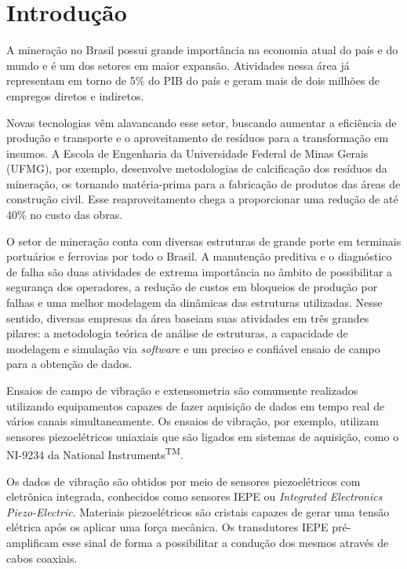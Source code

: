 \documentclass[11pt]{abntex2}
\begin{document}
\makeatletter
	\imprimircapa
	\imprimirfolhaderosto

	\begin{resumo}
		
	\end{resumo}

	\tableofcontents
	\newpage
	\listoffigures
	\newpage
	
	\chapter{Introdução}
		A mineração no Brasil possui grande importância na economia atual do país e
		do mundo e é um dos setores em maior expansão. Atividades nessa área já
		representam em torno de 5\% do PIB do país e geram mais de dois milhões de
		empregos diretos e indiretos.\cite{pib}

		Novas tecnologias vêm alavancando esse setor, buscando aumentar a eficiência
		de produção e transporte e o aproveitamento de resíduos para a
		transformação em insumos. A Escola de Engenharia da Universidade Federal de
		Minas Gerais (UFMG), por exemplo, desenvolve metodologias de calcificação
		dos resíduos da mineração, os tornando matéria-prima para a fabricação de
		produtos das áreas de construção civil. Esse reaproveitamento chega a
		proporcionar uma redução de até 40\% no custo das obras.\cite{mineracaoUFMG}
		
		O setor de mineração conta com diversas estruturas de grande porte em
		terminais portuários e ferrovias por todo o Brasil. A manutenção
		preditiva e o diagnóstico de falha são duas atividades de extrema
		importância no âmbito de possibilitar a segurança dos operadores, a
		redução de custos em bloqueios de produção por falhas e uma melhor
		modelagem da dinâmicas das estruturas utilizadas. Nesse sentido,
		diversas empresas da área baseiam suas atividades em três grandes
		pilares: a metodologia teórica de análise de estruturas, a capacidade de
		modelagem e simulação via \textit{software} e um preciso e confiável
		ensaio de campo para a obtenção de dados.
		
		Ensaios de campo de vibração e extensometria são comumente realizados
		utilizando equipamentos capazes de fazer aquisição de dados em tempo
		real de vários canais simultaneamente. Os ensaios de vibração, por
		exemplo, utilizam sensores piezoelétricos uniaxiais que são ligados em
		sistemas de aquisição, como o NI-9234 da National
		Instruments\textsuperscript{TM}.
		
		Os dados de vibração são obtidos por meio de sensores piezoelétricos com
		eletrônica integrada, conhecidos como sensores IEPE ou \textit{Integrated
		Electronics Piezo-Electric}. Materiais piezoelétricos são cristais capazes de
		gerar uma tensão elétrica após os aplicar uma força mecânica.
		Os transdutores IEPE pré-amplificam esse sinal de forma a possibilitar a
		condução dos mesmos através de cabos coaxiais.
\end{document}
